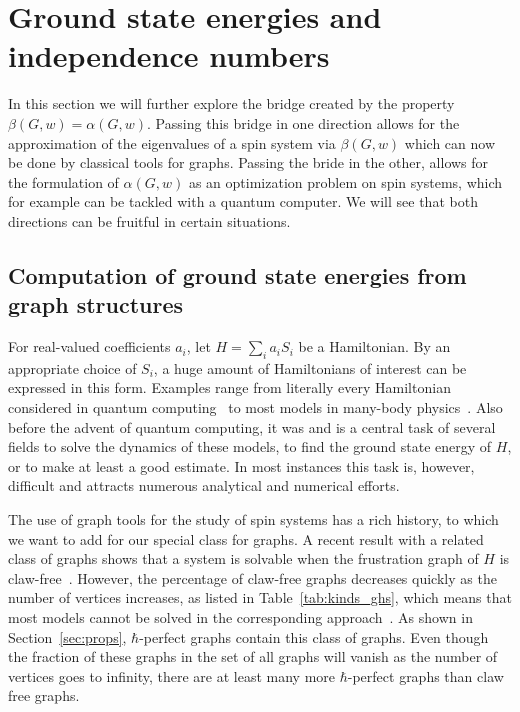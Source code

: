 \documentclass[
12pt,
prx,
aps,
reprint,
a4paper,
longbibliograph,
nofootinbib,
nobibnotes,
superscriptaddress
]{revtex4-2}
\theoremstyle{definition}
\begin{document}
\section{Ground state energies and independence numbers}
\label{sec:app}
In this section we will further explore the bridge created by the property $\beta(G,w)=\alpha(G,w)$. 
Passing this bridge in one direction allows for the approximation of the eigenvalues of a spin system via $\beta(G,w)$ which can now be done by classical tools for graphs.
Passing the bride in the other, allows for the formulation of $\alpha(G,w)$ as an optimization problem on spin systems, which for example can be tackled with a quantum computer.
We will see that both directions can be fruitful in certain situations. 




\subsection{Computation of ground state energies from graph structures}
For real-valued coefficients $a_i$, let $H=\sum_i a_i S_i$ be a Hamiltonian. By an appropriate choice of $S_i$, a huge amount of Hamiltonians of interest can be expressed in this form. Examples range from literally every Hamiltonian considered in quantum computing~\cite{lloyd_terhal_2016,ciani2019hamiltonian} to most models in many-body physics~\cite{chapman2020characterization,chapman2023unified,wang2024certifying}. 
Also before the advent of quantum computing, it was and is a central task of several fields to  solve the dynamics of these models, to find the ground state energy of $H$, or to make  at least a good estimate. In most instances this task is, however, difficult and  attracts numerous analytical and numerical efforts.

The use of graph tools for the study of spin systems has a rich history, to which we want to add for our special class for graphs. 
A recent result with a related class of graphs shows that a system is solvable when the frustration graph of $H$ is claw-free~\cite{chapman2023unified}. However, the percentage of claw-free graphs decreases quickly as the number of vertices increases, as listed in Table~\ref{tab:kinds_ghs}, which means that most models cannot be solved in the corresponding approach~\cite{chapman2023unified}. As shown in Section~\ref{sec:props}, $\hbar$-perfect graphs contain this class of graphs. Even though the fraction of these graphs in the set of all graphs will vanish as the number of vertices goes to infinity, there are at least many more $ \hbar$-perfect graphs than claw free graphs. 
\end{document}
